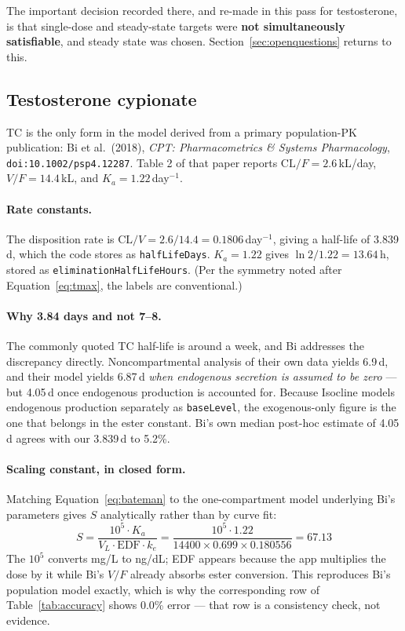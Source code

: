 \documentclass[11pt,a4paper]{article}
\newcommand{\code}[1]{\texttt{\small #1}}
\begin{document}
The important decision recorded there, and re-made in this pass for testosterone,
is that single-dose and steady-state targets were \textbf{not simultaneously
satisfiable}, and steady state was chosen. Section~\ref{sec:openquestions}
returns to this.

\subsection{Testosterone cypionate}
\label{sec:tc}

TC is the only form in the model derived from a primary population-PK
publication: Bi et al.\ (2018), \emph{CPT: Pharmacometrics \& Systems
Pharmacology}, \texttt{doi:10.1002/psp4.12287}. Table 2 of that paper reports
$\mathrm{CL}/F = 2.6$\,kL/day, $V/F = 14.4$\,kL, and $K_a = 1.22$\,day$^{-1}$.

\paragraph{Rate constants.} The disposition rate is
$\mathrm{CL}/V = 2.6/14.4 = 0.1806$\,day$^{-1}$, giving a half-life of 3.839\,d,
which the code stores as \code{halfLifeDays}. $K_a = 1.22$ gives
$\ln 2 / 1.22 = 13.64$\,h, stored as \code{eliminationHalfLifeHours}. (Per the
symmetry noted after Equation~\ref{eq:tmax}, the labels are conventional.)

\paragraph{Why 3.84 days and not 7--8.} The commonly quoted TC half-life is
around a week, and Bi addresses the discrepancy directly. Noncompartmental
analysis of their own data yields 6.9\,d, and their model yields 6.87\,d
\emph{when endogenous secretion is assumed to be zero} --- but 4.05\,d once
endogenous production is accounted for. Because Isocline models endogenous production
separately as \code{baseLevel}, the exogenous-only figure is the one that belongs
in the ester constant. Bi's own median post-hoc estimate of 4.05\,d agrees with
our 3.839\,d to 5.2\%.

\paragraph{Scaling constant, in closed form.} Matching Equation~\ref{eq:bateman}
to the one-compartment model underlying Bi's parameters gives $S$ analytically
rather than by curve fit:
\begin{equation}
S = \frac{10^5 \cdot K_a}{V_L \cdot \mathrm{EDF} \cdot k_e}
  = \frac{10^5 \cdot 1.22}{14400 \times 0.699 \times 0.180556} = 67.13
\label{eq:tcS}
\end{equation}
The $10^5$ converts mg/L to ng/dL; EDF appears because the app multiplies the dose
by it while Bi's $V/F$ already absorbs ester conversion. This reproduces Bi's
population model exactly, which is why the corresponding row of
Table~\ref{tab:accuracy} shows 0.0\% error --- that row is a consistency check,
not evidence.
\end{document}
